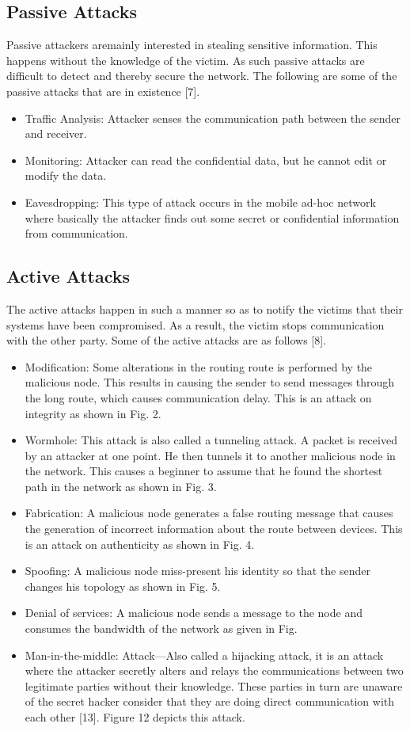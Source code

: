 \subsection{Passive Attacks}
Passive attackers aremainly interested in stealing sensitive information. This happens
without the knowledge of the victim. As such passive attacks are difficult to detect
and thereby secure the network. The following are some of the passive attacks that
are in existence [7].
\begin{itemize}
    \item Traffic Analysis: Attacker senses the communication path between the sender
    and receiver.
    \item Monitoring: Attacker can read the confidential data, but he cannot edit or modify
    the data.
    \item Eavesdropping: This type of attack occurs in the mobile ad-hoc network where
    basically the attacker finds out some secret or confidential information from
    communication.
\end{itemize}

\subsection{Active Attacks}
The active attacks happen in such a manner so as to notify the victims that their
systems have been compromised. As a result, the victim stops communication with
the other party. Some of the active attacks are as follows [8].
\begin{itemize}
    \item Modification: Some alterations in the routing route is performed by the malicious
    node. This results in causing the sender to send messages through the long route,
    which causes communication delay. This is an attack on integrity as shown in
    Fig. 2.
    \item Wormhole: This attack is also called a tunneling attack. A packet is received
    by an attacker at one point. He then tunnels it to another malicious node in the
    network. This causes a beginner to assume that he found the shortest path in the
    network as shown in Fig. 3.
    \item Fabrication: A malicious node generates a false routing message that causes the
    generation of incorrect information about the route between devices. This is an
    attack on authenticity as shown in Fig. 4.    
    \item Spoofing: A malicious node miss-present his identity so that the sender changes
    his topology as shown in Fig. 5.
    \item Denial of services: A malicious node sends a message to the node and consumes
    the bandwidth of the network as given in Fig.
    \item  Man-in-the-middle: Attack—Also called a hijacking attack, it is an attack where
    the attacker secretly alters and relays the communications between two legitimate
    parties without their knowledge. These parties in turn are unaware of the secret
    hacker consider that they are doing direct communication with each other [13].
    Figure 12 depicts this attack.
\end{itemize}

